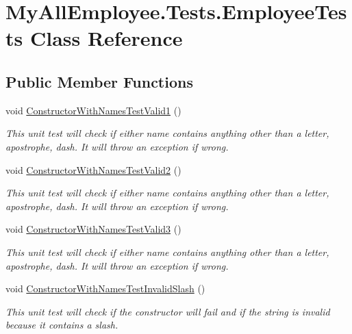\hypertarget{class_my_all_employee_1_1_tests_1_1_employee_tests}{}\section{My\+All\+Employee.\+Tests.\+Employee\+Tests Class Reference}
\label{class_my_all_employee_1_1_tests_1_1_employee_tests}
\subsection*{Public Member Functions}
\begin{DoxyCompactItemize}
\item 
void \hyperlink{class_my_all_employee_1_1_tests_1_1_employee_tests_a610698076f207b59950425f3a1c0574e}{Constructor\+With\+Names\+Test\+Valid1} ()
\begin{DoxyCompactList}\small\item\em This unit test will check if either name contains anything other than a letter, apostrophe, dash. It will throw an exception if wrong. \end{DoxyCompactList}\item 
void \hyperlink{class_my_all_employee_1_1_tests_1_1_employee_tests_abcf2093b93345bfd9225403f5fc85ad0}{Constructor\+With\+Names\+Test\+Valid2} ()
\begin{DoxyCompactList}\small\item\em This unit test will check if either name contains anything other than a letter, apostrophe, dash. It will throw an exception if wrong. \end{DoxyCompactList}\item 
void \hyperlink{class_my_all_employee_1_1_tests_1_1_employee_tests_a569d10ab841a21609fa5296650ad6f0d}{Constructor\+With\+Names\+Test\+Valid3} ()
\begin{DoxyCompactList}\small\item\em This unit test will check if either name contains anything other than a letter, apostrophe, dash. It will throw an exception if wrong. \end{DoxyCompactList}\item 
void \hyperlink{class_my_all_employee_1_1_tests_1_1_employee_tests_aa12327a24a378d606e2aa2b95c523cd5}{Constructor\+With\+Names\+Test\+Invalid\+Slash} ()
\begin{DoxyCompactList}\small\item\em This unit test will check if the constructor will fail and if the string is invalid because it contains a slash. \end{DoxyCompactList}\item 

\end{DoxyCompactItemize}
